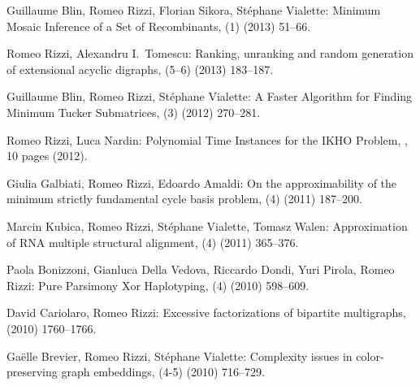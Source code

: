 \begin{etaremune}
  \item {\sc Guillaume Blin, Romeo Rizzi, Florian Sikora, St\'ephane Vialette:}
   \newblock  Minimum Mosaic Inference of a Set of Recombinants,
   (1) (2013) 51--66.

  \item {\sc Romeo Rizzi, Alexandru I.~Tomescu:}
   \newblock  Ranking, unranking and random generation of extensional acyclic digraphs,
   (5--6) (2013) 183--187. 

  \item {\sc Guillaume Blin, Romeo Rizzi, St\'ephane Vialette:}
   \newblock  A Faster Algorithm for Finding Minimum Tucker Submatrices,
   (3) (2012) 270--281.

  \item {\sc Romeo Rizzi, Luca Nardin:}
   \newblock  Polynomial Time Instances for the IKHO Problem,
   , 10 pages (2012).

  \item {\sc Giulia Galbiati, Romeo Rizzi, Edoardo Amaldi:}
   \newblock  On the approximability of the minimum strictly fundamental cycle basis problem,
   (4) (2011) 187--200.

  \item {Marcin Kubica, Romeo Rizzi, St\'ephane Vialette, Tomasz Walen:}
   \newblock Approximation of RNA multiple structural alignment,
   (4) (2011) 365--376.

  \item {\sc Paola Bonizzoni, Gianluca Della Vedova, Riccardo Dondi, Yuri Pirola, Romeo Rizzi:}
   \newblock  Pure Parsimony Xor Haplotyping,
   (4) (2010) 598--609.

  \item {\sc David Cariolaro, Romeo Rizzi:}
   \newblock  Excessive factorizations of bipartite multigraphs,
    (2010) 1760--1766.

  \item {\sc Ga\"elle Brevier, Romeo Rizzi, St\'ephane Vialette:}
   \newblock   Complexity issues in color-preserving graph embeddings,
   (4-5) (2010) 716--729.


\end{etaremune}

